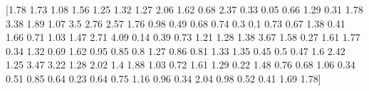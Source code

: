 \documentclass[preview]{standalone}
\begin{document}
\begin{center}
[1.78 1.73 1.08 1.56 1.25 1.32 1.27 2.06 1.62 0.68 2.37 0.33 0.05 0.66
 1.29 0.31 1.78 3.38 1.89 1.07 3.5  2.76 2.57 1.76 0.98 0.49 0.68 0.74
 0.3  0.1  0.73 0.67 1.38 0.41 1.66 0.71 1.03 1.47 2.71 4.09 0.14 0.39
 0.73 1.21 1.28 1.38 3.67 1.58 0.27 1.61 1.77 0.34 1.32 0.69 1.62 0.95
 0.85 0.8  1.27 0.86 0.81 1.33 1.35 0.45 0.5  0.47 1.6  2.42 1.25 3.47
 3.22 1.28 2.02 1.4  1.88 1.03 0.72 1.61 1.29 0.22 1.48 0.76 0.68 1.06
 0.34 0.51 0.85 0.64 0.23 0.64 0.75 1.16 0.96 0.34 2.04 0.98 0.52 0.41
 1.69 1.78]
\end{center}
\end{document}
